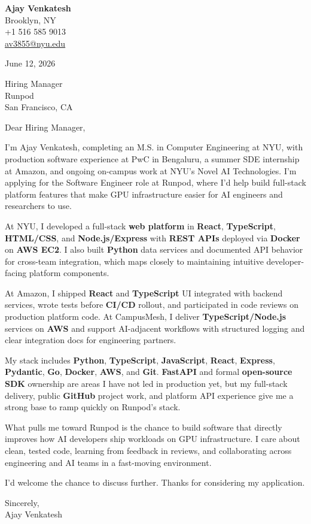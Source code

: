 \documentclass[letterpaper,11pt]{article}
\begin{document}
\begin{flushleft}
\textbf{\large Ajay Venkatesh} \\
Brooklyn, NY \\
+1 516 585 9013 \\
\href{mailto:av3855@nyu.edu}{av3855@nyu.edu}
\end{flushleft}
\vspace{10pt}
June 12, 2026
\vspace{6pt}

Hiring Manager \\
Runpod \\
San Francisco, CA

\vspace{10pt}

Dear Hiring Manager,

I'm Ajay Venkatesh, completing an M.S. in Computer Engineering at NYU, with production software experience at PwC in Bengaluru, a summer SDE internship at Amazon, and ongoing on-campus work at NYU's Novel AI Technologies. I'm applying for the Software Engineer role at Runpod, where I'd help build full-stack platform features that make GPU infrastructure easier for AI engineers and researchers to use.

At NYU, I developed a full-stack \textbf{web platform} in \textbf{React}, \textbf{TypeScript}, \textbf{HTML/CSS}, and \textbf{Node.js/Express} with \textbf{REST APIs} deployed via \textbf{Docker} on \textbf{AWS EC2}. I also built \textbf{Python} data services and documented API behavior for cross-team integration, which maps closely to maintaining intuitive developer-facing platform components.

At Amazon, I shipped \textbf{React} and \textbf{TypeScript} UI integrated with backend services, wrote tests before \textbf{CI/CD} rollout, and participated in code reviews on production platform code. At CampusMesh, I deliver \textbf{TypeScript/Node.js} services on \textbf{AWS} and support AI-adjacent workflows with structured logging and clear integration docs for engineering partners.

My stack includes \textbf{Python}, \textbf{TypeScript}, \textbf{JavaScript}, \textbf{React}, \textbf{Express}, \textbf{Pydantic}, \textbf{Go}, \textbf{Docker}, \textbf{AWS}, and \textbf{Git}. \textbf{FastAPI} and formal \textbf{open-source SDK} ownership are areas I have not led in production yet, but my full-stack delivery, public \textbf{GitHub} project work, and platform API experience give me a strong base to ramp quickly on Runpod's stack.

What pulls me toward Runpod is the chance to build software that directly improves how AI developers ship workloads on GPU infrastructure. I care about clean, tested code, learning from feedback in reviews, and collaborating across engineering and AI teams in a fast-moving environment.

I'd welcome the chance to discuss further. Thanks for considering my application.

\vspace{12pt}
Sincerely, \\
Ajay Venkatesh
\end{document}
